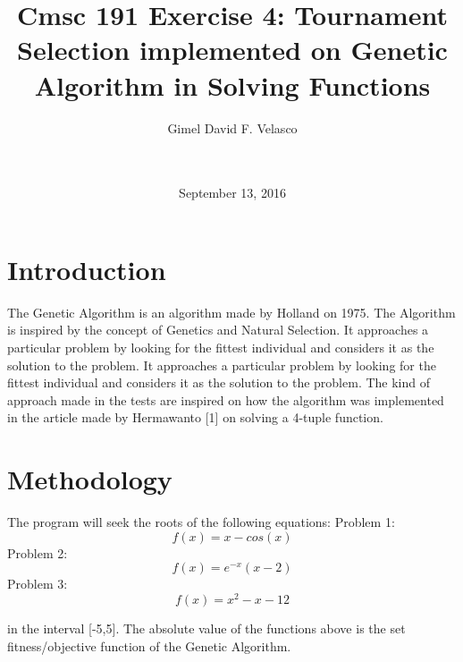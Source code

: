 \documentclass{acm_proc_article-sp}
\begin{document}
\title{Cmsc 191 Exercise 4: Tournament Selection implemented on Genetic Algorithm in Solving Functions}

\author{
\alignauthor
    Gimel David F. Velasco\\
    \\
    \\
}

\date{September 13, 2016}

\maketitle


\section{Introduction}
The Genetic Algorithm is an algorithm made by Holland on 1975. The Algorithm is inspired by the concept of Genetics and Natural Selection. It approaches a particular problem by looking for the fittest individual and considers it as the solution to the problem. It approaches a particular problem by looking for the fittest individual and considers it as the solution to the problem. The kind of approach made in the tests are inspired on how the algorithm was implemented in the article made by Hermawanto [1] on solving a 4-tuple function.

\section{Methodology}
The program will seek the roots of the following equations:
Problem 1:
\begin{equation}
f(x) = x - cos(x)
\end{equation}
Problem 2:
\begin{equation}
f(x) = e^{-x}(x-2)
\end{equation}
Problem 3:
\begin{equation}
f(x) = x^2 - x - 12
\end{equation}

in the interval [-5,5]. The absolute value of the functions above is the set fitness/objective function of the Genetic Algorithm.
\end{document}
